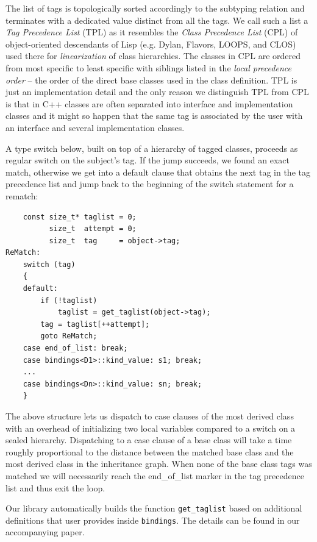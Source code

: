 \documentclass[preprint]{sigplanconf}
\makeatletter
\DeclareRobustCommand{\code}[1]{{\lstinline[breaklines=false,escapechar=@]{#1}}}
\makeatother
\begin{document}
The list of tags is topologically sorted accordingly to the subtyping relation 
and terminates with a dedicated value distinct from all the tags. We call such a 
list a \emph{Tag Precedence List} (TPL) as it resembles the \emph{Class 
Precedence List} (CPL) of object-oriented descendants of Lisp (e.g. Dylan, 
Flavors, LOOPS, and CLOS) used there for \emph{linearization} of class 
hierarchies. The classes in CPL are ordered from most specific to least specific 
with siblings listed in the \emph{local precedence order} -- the order of the 
direct base classes used in the class definition. TPL is just an implementation 
detail and the only reason we distinguish TPL from CPL is that in C++ classes 
are often separated into interface and implementation classes and it might so 
happen that the same tag is associated by the user with an interface and several 
implementation classes. 

A type switch below, built on top of a hierarchy of tagged classes, proceeds as 
regular switch on the subject's tag. If the jump succeeds, we found an exact 
match, otherwise we get into a default clause that obtains the next tag in the 
tag precedence list and jump back to the beginning of the switch statement for a 
rematch:

\begin{lstlisting}
    const size_t* taglist = 0;
          size_t  attempt = 0;
          size_t  tag     = object->tag;
ReMatch:
    switch (tag) 
    {
    default:
        if (!taglist) 
            taglist = get_taglist(object->tag);
        tag = taglist[++attempt];
        goto ReMatch;
    case end_of_list: break;
    case bindings<D1>::kind_value: s1; break;
    ...
    case bindings<Dn>::kind_value: sn; break;
    }
\end{lstlisting}

\noindent
The above structure lets us dispatch to case clauses of the most derived class 
with an overhead of initializing two local variables compared to a switch on a 
sealed hierarchy. Dispatching to a case clause of a base class will take a time 
roughly proportional to the distance between the matched base class and the most 
derived class in the inheritance graph. When none of the base class tags was 
matched we will necessarily reach the end\_of\_list marker in the tag precedence 
list and thus exit the loop.

Our library automatically builds the function \code{get_taglist} based on 
additional definitions that user provides inside \code{bindings}. The details 
can be found in our accompanying paper\cite{AP}.
\end{document}
